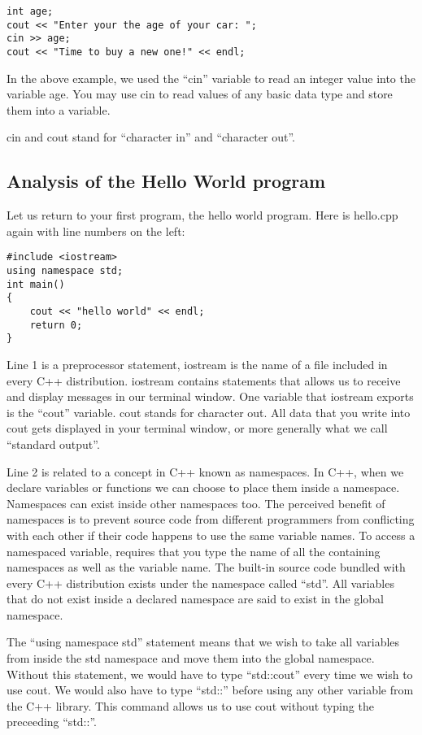 \documentclass[a4paper,12pt]{article}
\begin{document}
\begin{lstlisting}
int age;
cout << "Enter your the age of your car: ";
cin >> age;
cout << "Time to buy a new one!" << endl;
\end{lstlisting}

In the above example, we used the ``cin'' variable to read an integer value into the variable age. You may use cin to read values of any basic data type and store them into a variable. 

cin and cout stand for ``character in'' and ``character out''. 

\subsection*{Analysis of the Hello World program}

Let us return to your first program, the hello world program. Here is hello.cpp again with line numbers on the left:

\lstset{numbers=left}
\begin{lstlisting}
#include <iostream>
using namespace std;
int main()
{
	cout << "hello world" << endl;
	return 0;
}
\end{lstlisting}

Line 1 is a preprocessor statement, iostream is the name of a file included in every C++ distribution. iostream contains statements that allows us to receive and display messages in our terminal window. One variable that iostream exports is the ``cout'' variable. cout stands for character out. All data that you write into cout gets displayed in your terminal window, or more generally what we call ``standard output''. 

Line 2 is related to a concept in C++ known as namespaces. In C++, when we declare variables or functions we can choose to place them inside a namespace. Namespaces can exist inside other namespaces too. The perceived benefit of namespaces is to prevent source code from different programmers from conflicting with each other if their code happens to use the same variable names. To access a namespaced variable, requires that you type the name of all the containing namespaces as well as the variable name. The built-in source code bundled with every C++ distribution exists under the namespace called ``std''. All variables that do not exist inside a declared namespace are said to exist in the global namespace. 

The ``using namespace std'' statement means that we wish to take all variables from inside the std namespace and move them into the global namespace. Without this statement, we would have to type ``std::cout'' every time we wish to use cout. We would also have to type ``std::'' before using any other variable from the C++ library. This command allows us to use cout without typing the preceeding ``std::''.
\end{document}
